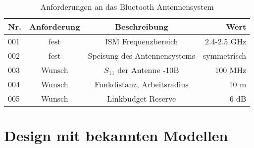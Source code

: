 
\begin{table}[!ht]
\centering
\begin{tabular}{lccr} \toprule 
Nr. & Anforderung & Beschreibung & Wert   \\ 
\midrule
001 & fest & ISM Frequenzbereich  & 2.4-2.5 GHz  \\ 
002 & fest &  Speisung des Antennensystems & symmetrisch  \\  
003 & Wunsch & $S_{11}$ der Antenne   -10B & 100 MHz  \\ 
004 & Wunsch & Funkdistanz, Arbeitsradius & 10 m   \\ 
005 & Wunsch & Linkbudget Reserve & 6 dB   \\ 
\bottomrule
  \end{tabular}
  \caption{Anforderungen an das Bluetooth Antennensystem}
  \label{AnforderungenAntenneSystem}
\end{table} 

\section{Design mit bekannten Modellen}\label{sec:DesignMitBekantenModellen}

